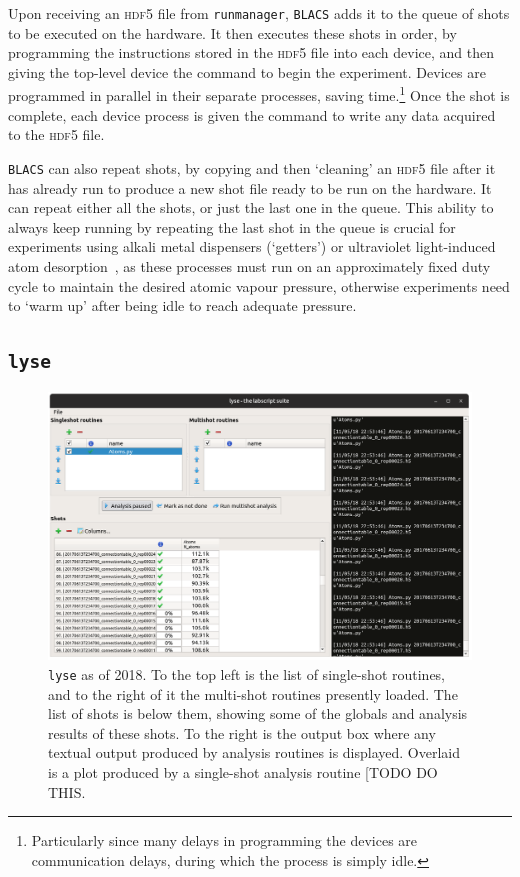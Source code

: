 Upon receiving an \textsc{hdf5} file from \texttt{runmanager}, \texttt{BLACS} adds it to the queue of shots to be executed on the hardware. It then executes these shots in order, by programming the instructions stored in the \textsc{hdf5} file into each device, and then giving the top-level device the command to begin the experiment. Devices are programmed in parallel in their separate processes, saving time.\footnote{Particularly since many delays in programming the devices are communication delays, during which the process is simply idle.} Once the shot is complete, each device process is given the command to write any data acquired to the \textsc{hdf5} file.

\texttt{BLACS} can also repeat shots, by copying and then `cleaning' an \textsc{hdf5} file after it has already run to produce a new shot file ready to be run on the hardware. It can repeat either all the shots, or just the last one in the queue. This ability to always keep running by repeating the last shot in the queue is crucial for experiments using alkali metal dispensers (`getters') or ultraviolet light-induced atom desorption~\cite{klempt_ultraviolet_2006}, as these processes must run on an approximately fixed duty cycle to maintain the desired atomic vapour pressure, otherwise experiments need to `warm up' after being idle to reach adequate pressure.

\subsection{\texttt{lyse}}

\begin{figure}
\begin{center}
\includegraphics[width=\textwidth]{figures/software/new_screenshots/lyse.png}
\caption{\texttt{lyse} as of 2018. To the top left is the list of single-shot routines, and to the right of it the multi-shot routines presently loaded. The list of shots is below them, showing some of the globals and analysis results of these shots. To the right is the output box where any textual output produced by analysis routines is displayed. Overlaid is a plot produced by a single-shot analysis routine [TODO DO THIS.}\label{fig:lyse}
\end{center}
\end{figure}

